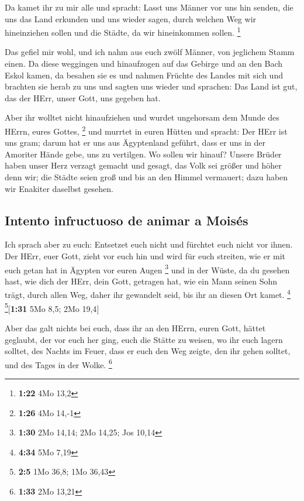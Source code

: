  Da kamet ihr zu mir alle und spracht: Lasst uns Männer
vor uns hin senden, die uns das Land erkunden und uns wieder sagen,
durch welchen Weg wir hineinziehen sollen und die Städte, da wir
hineinkommen sollen. \footnote{\textbf{1:22} 4Mo 13,2}

 Das gefiel mir wohl, und ich nahm aus euch zwölf Männer,
von jeglichem Stamm einen.  Da diese weggingen und
hinaufzogen auf das Gebirge und an den Bach Eskol kamen, da besahen sie
es  und nahmen Früchte des Landes mit sich und brachten
sie herab zu uns und sagten uns wieder und sprachen: Das Land ist gut,
das der HErr, unser Gott, uns gegeben hat.

 Aber ihr wolltet nicht hinaufziehen und wurdet
ungehorsam dem Munde des HErrn, eures Gottes, \footnote{\textbf{1:26}
  4Mo 14,-1}  und murrtet in euren Hütten und spracht:
Der HErr ist uns gram; darum hat er uns aus Ägyptenland geführt, dass er
uns in der Amoriter Hände gebe, uns zu vertilgen.  Wo
sollen wir hinauf? Unsere Brüder haben unser Herz verzagt gemacht und
gesagt, das Volk sei größer und höher denn wir; die Städte seien groß
und bis an den Himmel vermauert; dazu haben wir Enakiter daselbst
gesehen.

\hypertarget{intento-infructuoso-de-animar-a-moisuxe9s}{%
\subsection{Intento infructuoso de animar a
Moisés}\label{intento-infructuoso-de-animar-a-moisuxe9s}}

 Ich sprach aber zu euch: Entsetzet euch nicht und
fürchtet euch nicht vor ihnen.  Der HErr, euer Gott,
zieht vor euch hin und wird für euch streiten, wie er mit euch getan hat
in Ägypten vor euren Augen \footnote{\textbf{1:30} 2Mo 14,14; 2Mo 14,25;
  Jos 10,14}  und in der Wüste, da du gesehen hast, wie
dich der HErr, dein Gott, getragen hat, wie ein Mann seinen Sohn trägt,
durch allen Weg, daher ihr gewandelt seid, bis ihr an diesen Ort kamet.
\footnote{\textbf{4:34} 5Mo 7,19} \footnote{\textbf{2:5} 1Mo 36,8; 1Mo
  36,43}{[}\textbf{1:31} 5Mo 8,5; 2Mo 19,4{]}

 Aber das galt nichts bei euch, dass ihr an den HErrn,
euren Gott, hättet geglaubt,  der vor euch her ging, euch
die Stätte zu weisen, wo ihr euch lagern solltet, des Nachts im Feuer,
dass er euch den Weg zeigte, den ihr gehen solltet, und des Tages in der
Wolke. \footnote{\textbf{1:33} 2Mo 13,21}

